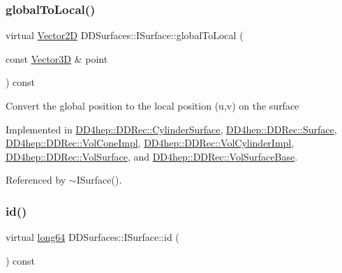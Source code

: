 \subsubsection{\texorpdfstring{global\+To\+Local()}{globalToLocal()}}
{\footnotesize\ttfamily virtual \hyperlink{class_d_d_surfaces_1_1_vector2_d}{Vector2D} D\+D\+Surfaces\+::\+I\+Surface\+::global\+To\+Local (\begin{DoxyParamCaption}\item[{const \hyperlink{class_d_d_surfaces_1_1_vector3_d}{Vector3D} \&}]{point }\end{DoxyParamCaption}) const\hspace{0.3cm}{\ttfamily [pure virtual]}}

Convert the global position to the local position (u,v) on the surface 

Implemented in \hyperlink{class_d_d4hep_1_1_d_d_rec_1_1_cylinder_surface_a020b7f61ba490d05d9473250714d6d5f}{D\+D4hep\+::\+D\+D\+Rec\+::\+Cylinder\+Surface}, \hyperlink{class_d_d4hep_1_1_d_d_rec_1_1_surface_ad7ea93419ec45ad4491c84065bd930aa}{D\+D4hep\+::\+D\+D\+Rec\+::\+Surface}, \hyperlink{class_d_d4hep_1_1_d_d_rec_1_1_vol_cone_impl_ae45867d32eb1958d209f1e1670620976}{D\+D4hep\+::\+D\+D\+Rec\+::\+Vol\+Cone\+Impl}, \hyperlink{class_d_d4hep_1_1_d_d_rec_1_1_vol_cylinder_impl_a5bcd55a843e711dff3e03eb3e14887bd}{D\+D4hep\+::\+D\+D\+Rec\+::\+Vol\+Cylinder\+Impl}, \hyperlink{class_d_d4hep_1_1_d_d_rec_1_1_vol_surface_aabd166d0d4ad58b57361dbfd0b81fc4d}{D\+D4hep\+::\+D\+D\+Rec\+::\+Vol\+Surface}, and \hyperlink{class_d_d4hep_1_1_d_d_rec_1_1_vol_surface_base_a9f2549dc5b7d2fbf58d1ef8c6699b49f}{D\+D4hep\+::\+D\+D\+Rec\+::\+Vol\+Surface\+Base}.



Referenced by $\sim$\+I\+Surface().

\hypertarget{class_d_d_surfaces_1_1_i_surface_aaf7bf967d4a0652c620ec9754a2b37c1}{}\label{class_d_d_surfaces_1_1_i_surface_aaf7bf967d4a0652c620ec9754a2b37c1} 
\subsubsection{\texorpdfstring{id()}{id()}}
{\footnotesize\ttfamily virtual \hyperlink{namespace_d_d_surfaces_ab6b3da366f31f80aec56447ac4442e78}{long64} D\+D\+Surfaces\+::\+I\+Surface\+::id (\begin{DoxyParamCaption}{ }\end{DoxyParamCaption}) const\hspace{0.3cm}{\ttfamily [pure virtual]}}



